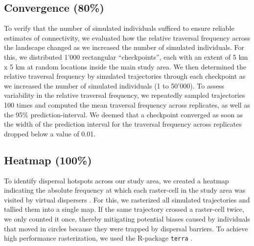 \documentclass[abstract=on,10pt,a4paper,bibliography=totocnumbered]{article}
\begin{document}
\subsection{Convergence (80\%)}
To verify that the number of simulated individuals sufficed to ensure reliable
estimates of connectivity, we evaluated how the relative traversal frequency
across the landscape changed as we increased the number of simulated
individuals. For this, we distributed 1'000 rectangular ``checkpoints'', each
with an extent of 5 km x 5 km at random locations inside the main study area. We
then determined the relative traversal frequency by simulated trajectories
through each checkpoint as we increased the number of simulated individuals (1
to 50'000). To assess variability in the relative traversal frequency, we
repeatedly sampled trajectories 100 times and computed the mean traversal
frequency across replicates, as well as the 95\% prediction-interval. We deemed
that a checkpoint converged as soon as the width of the prediction interval for
the traversal frequency across replicates dropped below a value of 0.01.

\subsection{Heatmap (100\%)}
To identify dispersal hotspots across our study area, we created a heatmap
indicating the absolute frequency at which each raster-cell in the study area
was visited by virtual dispersers \citep{Hauenstein.2019, Peer.2008}. For this,
we rasterized all simulated trajectories and tallied them into a single map. If
the same trajectory crossed a raster-cell twice, we only counted it once,
thereby mitigating potential biases caused by individuals that moved in circles
because they were trapped by dispersal barriers. To achieve high performance
rasterization, we used the R-package {\tt terra} \citep{Hijmans.2020}.
\end{document}
